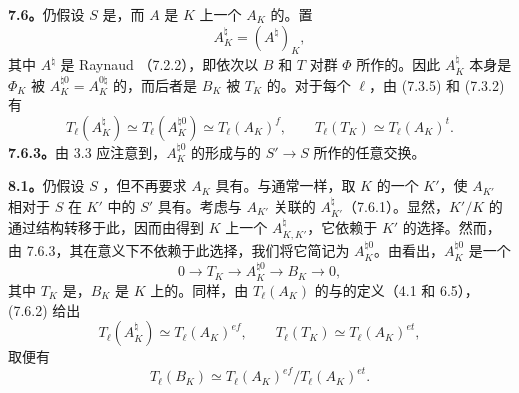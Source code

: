 \textbf{7.6。}仍假设 $S$ 是，而 $A$ 是 $K$ 上一个 $A_K$ 的。置
\begin{equation}\tag{7.6.1}
 A_K^\natural=(A^\natural)_K,
\end{equation}
其中 $A^\natural$ 是 Raynaud （7.2.2），即依次以 $B$ 和 $T$ 对群 $\Phi$ 所作的。因此 $A_K^\natural$ 本身是 $\Phi_K$ 被 $A_K^{\natural0}=A_K^{0\natural}$ 的，而后者是 $B_K$ 被 $T_K$ 的。对于每个 $\ell$，由 (7.3.5) 和 (7.3.2) 有
\begin{equation}\tag{7.6.2}
 T_\ell(A_K^\natural)\simeq T_\ell(A_K^{\natural0})\simeq T_\ell(A_K)^f,
 \qquad T_\ell(T_K)\simeq T_\ell(A_K)^t.
\end{equation}
\textbf{7.6.3。}由 3.3 应注意到，$A_K^{\natural0}$ 的形成与的 $S'\to S$ 所作的任意交换。

\textbf{8.1。}仍假设 $S$ ，但不再要求 $A_K$ 具有。与通常一样，取 $K$ 的一个 $K'$，使 $A_{K'}$ 相对于 $S$ 在 $K'$ 中的 $S'$ 具有。考虑与 $A_{K'}$ 关联的 $A_{K'}^\natural$（7.6.1）。显然，$K'/K$ 的通过结构转移于此，因而由得到 $K$ 上一个 $A_{K,K'}^\natural$，它依赖于 $K'$ 的选择。然而，由 7.6.3，其在意义下不依赖于此选择，我们将它简记为 $A_K^{\natural0}$。由看出，$A_K^{\natural0}$ 是一个
\begin{equation}\tag{8.1.1}
 0\longrightarrow T_K\longrightarrow A_K^{\natural0}\longrightarrow B_K\longrightarrow0,
\end{equation}
其中 $T_K$ 是，$B_K$ 是 $K$ 上的。同样，由 $T_\ell(A_K)$ 的与的定义（4.1 和 6.5）， (7.6.2) 给出
\begin{equation}\tag{8.1.2}
 T_\ell(A_K^\natural)\simeq T_\ell(A_K)^{ef},\qquad
 T_\ell(T_K)\simeq T_\ell(A_K)^{et},
\end{equation}
取便有
\begin{equation}\tag{8.1.3}
 T_\ell(B_K)\simeq T_\ell(A_K)^{ef}/T_\ell(A_K)^{et}.
\end{equation}

